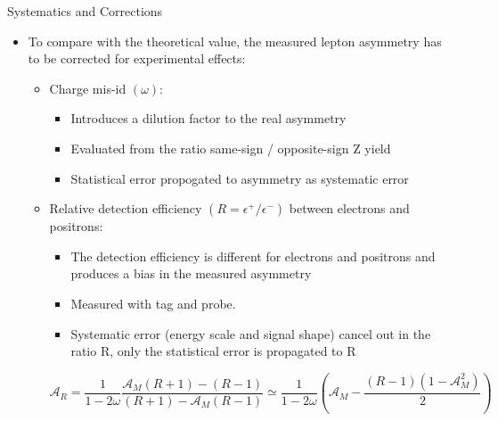 \documentclass[t, 8pt]{beamer}
\begin{document}
\begin{frame}{Systematics and Corrections}
  \begin{itemize}
    \item To compare with the theoretical value, the measured lepton asymmetry has to be corrected for experimental effects:
    \begin{itemize}
      \item Charge mis-id $(\omega)$: 
      \begin{itemize}
        \item Introduces a dilution factor to the real asymmetry
        \item Evaluated from the ratio same-sign / opposite-sign Z yield
        \item Statistical error propogated to asymmetry as systematic error
      \end{itemize}
      \item Relative detection efficiency $(R = \epsilon^+/\epsilon^-)$ between electrons and positrons: 
      \begin{itemize}
        \item The detection efficiency is different for electrons and positrons and produces a bias in the measured asymmetry
        \item Measured with tag and probe.
        \item Systematic error (energy scale and signal shape) cancel out in the ratio R, only the statistical error is propagated to R
      \end{itemize}
      \begin{center}
      \begin{equation}
        \mathcal{A}_R=
          \frac{1}{1-2\omega}\frac{ \mathcal{A}_M\left(R+1\right) - \left(R-1\right)}{\left(R+1\right)-\mathcal{A}_M \left(R-1\right)}
          \simeq 
          \frac{1}{1-2\omega}\left(\mathcal{A}_M -\frac{\left(R-1\right)\left(1-\mathcal{A}_M^2\right)}{2}\right)
      \end{equation}
      \end{center}
    \end{itemize}
  \end{itemize}
\end{frame}
\end{document}
